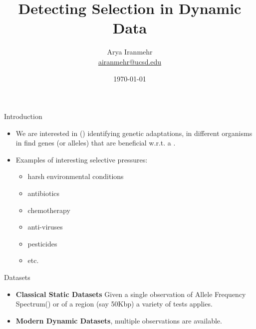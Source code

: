 \documentclass[t]{beamer} %
\title{Detecting Selection in Dynamic Data}
\subtitle{}
\author[Arya Iranmehr]
{%
  \texorpdfstring{
      \centering
      Arya Iranmehr\\
      \href{mailto:airanmehr@ucsd.edu}{airanmehr@ucsd.edu}
  }
  {Arya Iranmehr}
}
\institute{
Bafna Lab\\
University of California, San Diego}
\date{
\monthyeardate\today}
\begin{document}
\begin{frame}
  \titlepage
\end{frame}


\begin{frame}{Introduction}
\begin{itemize}
\item We are interested in () identifying genetic adaptations, 
in different organisms in find genes (or alleles) that are beneficial 
w.r.t. a  .
\item Examples of interesting selective pressures:
\begin{itemize}
	\item harsh environmental conditions
	\item antibiotics
	\item chemotherapy
	\item anti-viruses
	\item pesticides 
	\item etc.
\end{itemize} 
\end{itemize}
\end{frame}



\begin{frame}{Datasets}
\begin{itemize}
\item {\bf Classical Static Datasets}
Given a single observation of Allele 
Frequency Spectrum()  or  of a region (say 
50Kbp) a 
variety 
of tests applies.
\item {\bf Modern Dynamic Datasets}, multiple observations are available.
\end{itemize}
\end{frame}
\end{document}
